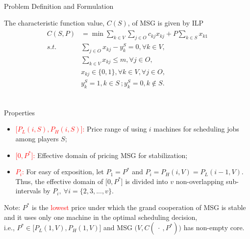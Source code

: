\documentclass[14pt]{beamer}
\begin{document}
\begin{frame}{Problem Definition and Formulation}
	\begin{definition}\label{definition:IVPU}
	\small
	\justifying
	The characteristic function value, $C(S)$, of MSG is given by ILP\\
	\vspace{-4mm}
	\begin{eqnarray*}\label{eqn:IVPU}
	\begin{aligned}
C(S,P)   &= {\min} \sum_{k\in V}\sum_{j\in O} {c_{kj} x_{kj}} + {P\sum_{k\in S} x_{k1}} \\
	{s.t.}\quad & \sum_{j \in O} x_{kj}-y_k^S=0, \forall k \in V, \\
	& \sum_{k\in V} x_{kj} \leq m,\forall j \in O,  \\
	& x_{kj} \in \{0,1\} , \forall k \in V, \forall j \in O,\\
	& y_k^S=1, k \in S~; y_k^S=0, k \notin S.
	\end{aligned}
	\end{eqnarray*}
		~\\
	\end{definition}
\end{frame}

\begin{frame}{Properties}
	\begin{definition}\label{definition:subinterval}
	\small
	\justifying
	\begin{itemize}
	\item \textcolor{red}{$\big[P_L(i,S),P_H(i,S)\big]$:} Price range of using $i$ machines for scheduling jobs among players $S$;
		\pause
	\item \textcolor{red}{$\big[0,P^*\big]$:} Effective domain of pricing MSG for stabilization;
	\pause
	\item \textcolor{red}{$P_i$:} For easy of exposition, let $P_1 = P^*$ and $P_i = P_H(i,V) = P_L(i-1,V)$. Thus, the effective domain of $\big[0,P^*\big]$ is divided into $v$ non-overlapping sub-intervals by $P_i,~\forall i=\{2,3,...,v\}$.
	\end{itemize}
	\end{definition}
	\vspace{4mm}
	\footnotesize
	\centering
	Note: $P^*$ is the \textcolor{red}{lowest} price under which the grand cooperation of MSG is stable and it uses only one machine in the optimal scheduling decision,\\ i.e., $P^* \in \big[P_L(1,V),P_H(1,V) \big]$ and MSG $\big(V,C(~\cdot~, P^*)\big)$ has non-empty core.
\end{frame}
\end{document}

